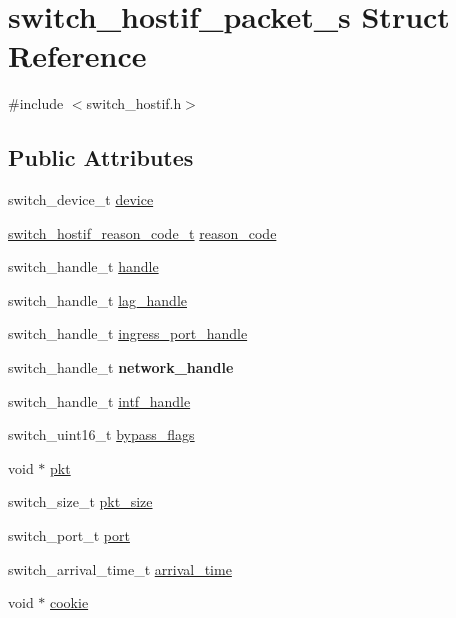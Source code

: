 \hypertarget{structswitch__hostif__packet__s}{\section{switch\+\_\+hostif\+\_\+packet\+\_\+s Struct Reference}
\label{structswitch__hostif__packet__s}
}


{\ttfamily \#include $<$switch\+\_\+hostif.\+h$>$}

\subsection*{Public Attributes}
\begin{DoxyCompactItemize}
\item 
switch\+\_\+device\+\_\+t \hyperlink{structswitch__hostif__packet__s_a9b7931344bd7cf4209e9f24e81c13d31}{device}
\item 
\hyperlink{group__HostInterface_gab8b13524888d4f506357fae04c44babc}{switch\+\_\+hostif\+\_\+reason\+\_\+code\+\_\+t} \hyperlink{structswitch__hostif__packet__s_aaabbb3db651c61453e5bd52e95f09942}{reason\+\_\+code}
\item 
switch\+\_\+handle\+\_\+t \hyperlink{structswitch__hostif__packet__s_a0afca65ef0c09c446b9bbed2eb41c4cb}{handle}
\item 
switch\+\_\+handle\+\_\+t \hyperlink{structswitch__hostif__packet__s_ac1010713f560f3ab5ee2722c4c5c8771}{lag\+\_\+handle}
\item 
switch\+\_\+handle\+\_\+t \hyperlink{structswitch__hostif__packet__s_a613ae4e693a0e113d6c122d45a83a718}{ingress\+\_\+port\+\_\+handle}
\item 
\hypertarget{structswitch__hostif__packet__s_a08079fa227021b546e9b0784a3fb504d}{switch\+\_\+handle\+\_\+t {\bfseries network\+\_\+handle}}\label{structswitch__hostif__packet__s_a08079fa227021b546e9b0784a3fb504d}

\item 
switch\+\_\+handle\+\_\+t \hyperlink{structswitch__hostif__packet__s_aa98edd1c4f3468c3aadef8980ea157a9}{intf\+\_\+handle}
\item 
switch\+\_\+uint16\+\_\+t \hyperlink{structswitch__hostif__packet__s_a8b6ada7d0d168182daae16fe40849b8b}{bypass\+\_\+flags}
\item 
void $\ast$ \hyperlink{structswitch__hostif__packet__s_af0229aad0a9fe6783961720ce42a887a}{pkt}
\item 
switch\+\_\+size\+\_\+t \hyperlink{structswitch__hostif__packet__s_ab4dc6e1f2a6729cb51032ec52c4f8931}{pkt\+\_\+size}
\item 
switch\+\_\+port\+\_\+t \hyperlink{structswitch__hostif__packet__s_add347567c8574a2a9b23a30b1310b4cb}{port}
\item 
switch\+\_\+arrival\+\_\+time\+\_\+t \hyperlink{structswitch__hostif__packet__s_a25e59dce20c857179d7ddff4eda4cf01}{arrival\+\_\+time}
\item 
void $\ast$ \hyperlink{structswitch__hostif__packet__s_a539be41c85958076ed897bc458b1b202}{cookie}
\end{DoxyCompactItemize}


